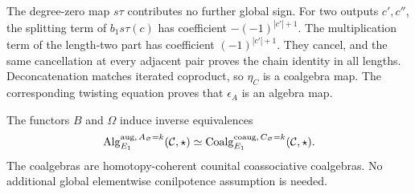 The degree-zero map \(s\tau\) contributes no further global sign.
For two outputs \(c',c''\), the splitting term of \(b_1s\tau(c)\) has coefficient \(-(-1)^{|c'|+1}\).
The multiplication term of the length-two part has coefficient \((-1)^{|c'|+1}\).
They cancel, and the same cancellation at every adjacent pair proves the chain identity in all lengths.
Deconcatenation matches iterated coproduct, so \(\eta_C\) is a coalgebra map.
The corresponding twisting equation proves that \(\epsilon_A\) is an algebra map.

\begin{theorem}\label{ogd:thm:duality}
The functors \(B\) and \(\Omega\) induce inverse equivalences
\[
 \operatorname{Alg}^{\mathrm{aug},\,A_\varnothing=k}_{E_1}(\mathcal C,\star)
 \simeq
 \operatorname{Coalg}^{\mathrm{coaug},\,C_\varnothing=k}_{E_1}(\mathcal C,\star).
\]
The coalgebras are homotopy-coherent counital coassociative coalgebras.
No additional global elementwise conilpotence assumption is needed.
\end{theorem}
